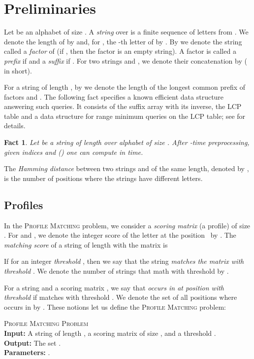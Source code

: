 \documentclass{article}
\theoremstyle{plain}
\newtheorem{fact}[theorem]{Fact}
\theoremstyle{definition}
\newenvironment{dsproblem}[1]
{\begin{center}\begin{lrbox}{\mybox}\begin{minipage}{0.96\columnwidth}#1 \textsc{Problem}\\}
{\end{minipage}\end{lrbox}\fbox{\usebox{\mybox}}\end{center}}
\newcommand{\defdsproblemoutpar}[4]{
  \begin{dsproblem}{#1}
\textbf{Input:} #2\\
\textbf{Output:} #3\\
\textbf{Parameters:} #4
  \end{dsproblem}
  }
\newcommand{\PM}{\textsc{Profile Matching}\xspace}
\begin{document}
  \section{Preliminaries}\label{sec:Preliminaries}
    Let  be an alphabet of size .
    A \emph{string}  over  is a finite sequence of letters from .
    We denote the length of  by  and, for ,
    the -th letter of  by .
    By  we denote the string  called a \emph{factor} of 
    (if , then the factor is an empty string).
    A factor is called a \emph{prefix} if  and a \emph{suffix} if .
    For two strings  and , we denote their concatenation by  ( in short).

    For a string  of length , by  we denote the length of the longest common prefix of factors  and .
    The following fact specifies a known efficient data structure answering such queries.
    It consists of the suffix array with its inverse, the LCP table and a data structure for range minimum queries on
    the LCP table; see \cite{AlgorithmsOnStrings} for details.

    \begin{fact}\label{fct:ver}
      Let  be a string of length  over alphabet of size .
      After -time preprocessing, given indices  and  () one can compute  in  time.
    \end{fact}

    The \emph{Hamming distance} between two strings  and  of the same length,
    denoted by , is the number of positions where the strings have different letters.

    \subsection{Profiles}
    In the \PM problem, we consider a \emph{scoring matrix} (a profile)  of size .
    For  and , we denote the integer score of the letter 
    at the position~ by .
    The \emph{matching score} of a string  of length  with the matrix  is
    
    If  for an integer \emph{threshold} , then we say that the string  \emph{matches the matrix 
    with threshold }.
    We denote the number of strings  that math  with threshold  by .
    
    For a string  and a scoring matrix , we say that  \emph{occurs in  at position 
    with threshold } if  matches  with threshold .
    We denote the set of all positions where  occurs in  by .
    These notions let us define the \PM problem:

    \defdsproblemoutpar{\PM}{
      A string  of length , a scoring matrix  of size , and
      a threshold .
    }{
      The set .
    }{
      .
    }
\end{document}

